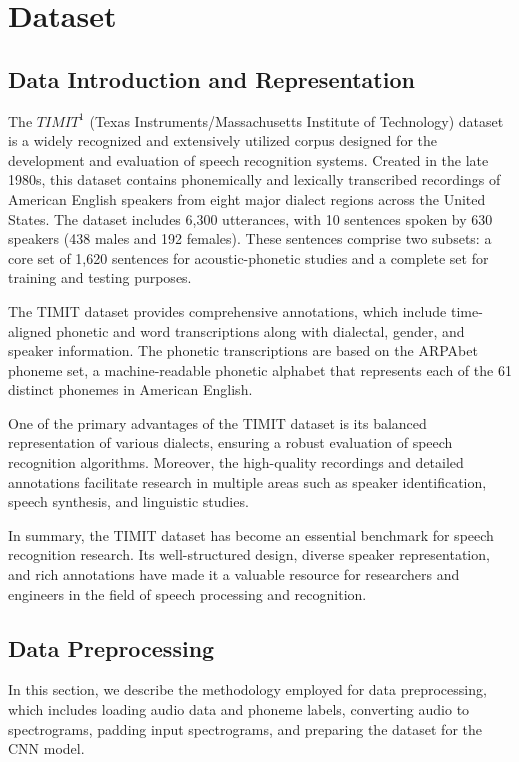 \documentclass[12pt]{article}
\begin{document}
\section{Dataset}

\subsection{Data Introduction and Representation}

The \(TIMIT^1\) (Texas Instruments/Massachusetts Institute of Technology) dataset is a widely recognized and extensively utilized corpus designed for the development and evaluation of speech recognition systems. Created in the late 1980s, this dataset contains phonemically and lexically transcribed recordings of American English speakers from eight major dialect regions across the United States. The dataset includes 6,300 utterances, with 10 sentences spoken by 630 speakers (438 males and 192 females). These sentences comprise two subsets: a core set of 1,620 sentences for acoustic-phonetic studies and a complete set for training and testing purposes.

The TIMIT dataset provides comprehensive annotations, which include time-aligned phonetic and word transcriptions along with dialectal, gender, and speaker information. The phonetic transcriptions are based on the ARPAbet phoneme set, a machine-readable phonetic alphabet that represents each of the 61 distinct phonemes in American English.

One of the primary advantages of the TIMIT dataset is its balanced representation of various dialects, ensuring a robust evaluation of speech recognition algorithms. Moreover, the high-quality recordings and detailed annotations facilitate research in multiple areas such as speaker identification, speech synthesis, and linguistic studies.

In summary, the TIMIT dataset has become an essential benchmark for speech recognition research. Its well-structured design, diverse speaker representation, and rich annotations have made it a valuable resource for researchers and engineers in the field of speech processing and recognition.

\subsection{Data Preprocessing}

In this section, we describe the methodology employed for data preprocessing, which includes loading audio data and phoneme labels, converting audio to spectrograms, padding input spectrograms, and preparing the dataset for the CNN model.
\end{document}
